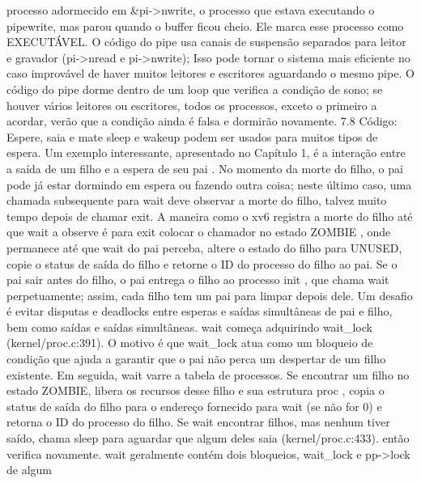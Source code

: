 processo  adormecido  em  &pi->nwrite,  o  processo  que  estava  executando  o  pipewrite,  mas  parou  quando  o  buffer  ficou  
cheio.  Ele  marca  esse  processo  como  EXECUTÁVEL.
 O  código  do  pipe  usa  canais  de  suspensão  separados  para  leitor  e  gravador  (pi->nread  e  pi->nwrite);
 Isso  pode  tornar  o  sistema  mais  eficiente  no  caso  improvável  de  haver  muitos  leitores  e  escritores  
aguardando  o  mesmo  pipe.  O  código  do  pipe  dorme  dentro  de  um  loop  que  verifica  a  condição  de  sono;  se  
houver  vários  leitores  ou  escritores,  todos  os  processos,  exceto  o  primeiro  a  acordar,  verão  que  a  condição  
ainda  é  falsa  e  dormirão  novamente.
 7.8  Código:  Espere,  saia  e  mate
 sleep  e  wakeup  podem  ser  usados  para  muitos  tipos  de  espera.  Um  exemplo  interessante,  apresentado  no  Capítulo  1,  é  
a  interação  entre  a  saída  de  um  filho  e  a  espera  de  seu  pai .  No  momento  da  morte  do  filho,  o  pai  pode  já  estar  dormindo  
em  espera  ou  fazendo  outra  coisa;  neste  último  caso,  uma  chamada  subsequente  para  wait  deve  observar  a  morte  do  
filho,  talvez  muito  tempo  depois  de  chamar  exit.  A  maneira  como  o  xv6  registra  a  morte  do  filho  até  que  wait  a  observe  é  
para  exit  colocar  o  chamador  no  estado  ZOMBIE ,  onde  permanece  até  que  wait  do  pai  perceba,  altere  o  estado  do  filho  
para  UNUSED,  copie  o  status  de  saída  do  filho  e  retorne  o  ID  do  processo  do  filho  ao  pai.  Se  o  pai  sair  antes  do  filho,  o  
pai  entrega  o  filho  ao  processo  init ,  que  chama  wait  perpetuamente;  assim,  cada  filho  tem  um  pai  para  limpar  depois  
dele.  Um  desafio  é  evitar  disputas  e  deadlocks  entre  esperas  e  saídas  simultâneas  de  pai  e  filho,  bem  como  saídas  e  
saídas  simultâneas.
 wait  começa  adquirindo  wait_lock  (kernel/proc.c:391).  O  motivo  é  que  wait_lock  atua  como  um  bloqueio  
de  condição  que  ajuda  a  garantir  que  o  pai  não  perca  um  despertar  de  um  filho  existente.
 Em  seguida,  wait  varre  a  tabela  de  processos.  Se  encontrar  um  filho  no  estado  ZOMBIE,  libera  os  recursos  desse  filho  e  
sua  estrutura  proc ,  copia  o  status  de  saída  do  filho  para  o  endereço  fornecido  para  wait  (se  não  for  0)  e  retorna  o  ID  do  
processo  do  filho.  Se  wait  encontrar  filhos,  mas  nenhum  tiver  saído,  chama  sleep  para  aguardar  que  algum  deles  saia  
(kernel/proc.c:433).  então  verifica  novamente.  wait  geralmente  contém  dois  bloqueios,  wait_lock  e  pp->lock  de  algum  
